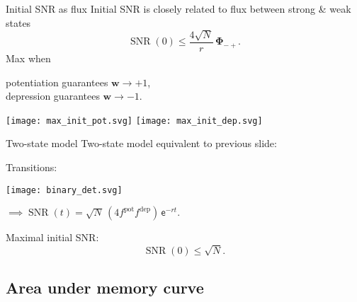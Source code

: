 \documentclass{beamer}%
\DeclareMathOperator{\SNR}{SNR}
\DeclareMathOperator{\snr}{SNR}
\newcommand{\w}{\mathbf{w}}
\newcommand{\F}{\boldsymbol{\Phi}}
\newcommand{\pot}{^{\text{pot}}}
\newcommand{\dep}{^{\text{dep}}}
\renewcommand{\e}{\mathsf{e}}
\begin{document}

\begin{frame}{Initial SNR as flux}
%
 Initial SNR is closely related to flux between strong \& weak states
 \begin{equation*}
   \SNR(0) \leq \frac{4\sqrt{N}}{r}\,\F_{-+}.
 \end{equation*}
 Max when {\parbox[t]{8cm}{potentiation guarantees $\w\to+1$,\\
 depression guarantees $\w\to-1$.}}
 \begin{center}
   \texttt{[image: max\_init\_pot.svg]}
   \hp \hp
   \texttt{[image: max\_init\_dep.svg]}
 \end{center}
%
\end{frame}


\begin{frame}{Two-state model}
%
 Two-state model equivalent to previous slide:
  \begin{center}
  Transitions:
   \parbox{2cm}{\texttt{[image: binary\_det.svg]}}
   $\implies\snr(t)=\sqrt{N}\,(4 f\pot f\dep)\,\e^{-rt}.$
  \end{center}

 \vp Maximal initial SNR:\note[item]{$f\pot=\half$}
 \begin{equation*}
   \snr(0) \leq \sqrt{N}.
 \end{equation*}
%
\end{frame}


\subsection{Area under memory curve}

\end{document}
